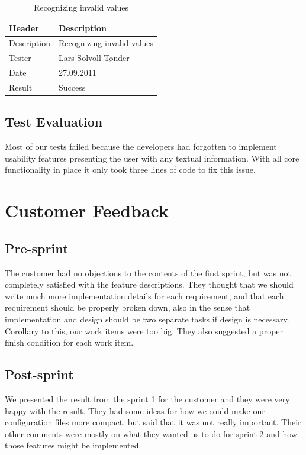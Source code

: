 \begin{table}[!htb] \footnotesize \center
\caption{Recognizing invalid values \label{tab:sp1_tid07}}
\begin{tabular}{l l}
	\toprule
	Header & Description \\
	\midrule
	Description &  Recognizing invalid values  \\
	Tester & Lars Solvoll Tønder \\
	Date & 27.09.2011 \\
	Result & Success\\
	\bottomrule
\end{tabular}
\end{table}

\subsection{Test Evaluation}
Most of our tests failed because the developers had forgotten to implement
usability features presenting the user with any textual information. With all
core functionality in place it only took three lines of code to fix this issue.


\section{Customer Feedback}
\label{sec:sp1:feedback}
\subsection{Pre-sprint}
The customer had no objections to the contents of the first sprint, but was not
completely satisfied with the feature descriptions. They thought that we should
write much more implementation details for each requirement, and that each
requirement should be properly broken down, also in the sense that
implementation and design should be two separate tasks if design is necessary.
Corollary to this, our work items were too big. They also suggested a proper
finish condition for each work item.

\subsection{Post-sprint}
We presented the result from the sprint 1 for the customer and they were very
happy with the result. They had some ideas for how we could make our
configuration files more compact, but said that it was not really important.
Their other comments were mostly on what they wanted us to do for sprint 2
and how those features might be implemented.


